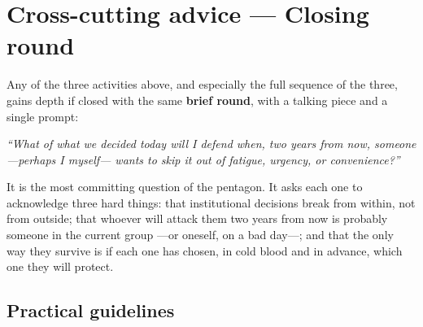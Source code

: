 \documentclass[11pt, a4paper]{article}
\begin{document}
\newpage

\section*{Cross-cutting advice --- Closing round}

Any of the three activities above, and especially the full sequence of the three, gains depth if closed with the same \textbf{brief round}, with a talking piece and a single prompt:

\vspace{0.5em}

\begin{center}
\begin{tcolorbox}[
  enhanced, colback=organizacionVerde, colframe=organizacionVerde,
  boxrule=0pt, arc=3pt,
  left=18pt, right=18pt, top=16pt, bottom=16pt,
  width=0.88\linewidth,
  halign=center
]
  {\color{parch}\itshape\large ``What of what we decided today will I defend when, two years from now, someone ---perhaps I myself--- wants to skip it out of fatigue, urgency, or convenience?''}
\end{tcolorbox}
\end{center}

\vspace{0.5em}

It is the most committing question of the pentagon. It asks each one to acknowledge three hard things: that institutional decisions break from within, not from outside; that whoever will attack them two years from now is probably someone in the current group ---or oneself, on a bad day---; and that the only way they survive is if each one has chosen, in cold blood and in advance, which one they will protect.

\subsection*{Practical guidelines}
\end{document}
